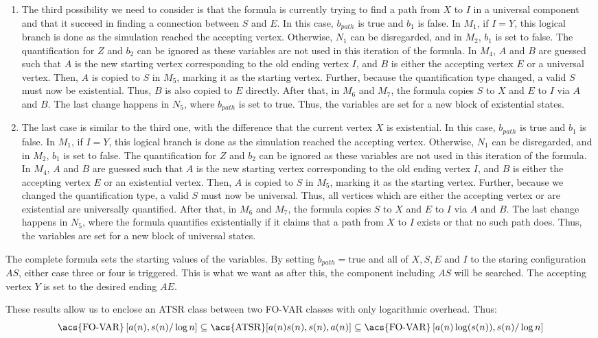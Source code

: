 \begin{enumerate}
    \item The third possibility we need to consider is that the formula is currently trying to find a path from $X$ to $I$ in a universal component and that it succeed in finding a connection between $S$ and $E$.
    In this case, $b_{path}$ is true and $b_1$ is false.
    In $M_1$, if $I = Y$, this logical branch is done as the simulation reached the accepting vertex.
    Otherwise, $N_1$ can be disregarded, and in $M_2$, $b_1$ is set to false.
    The quantification for $Z$ and $b_2$ can be ignored as these variables are not used in this iteration of the formula.
    In $M_4$, $A$ and $B$ are guessed such that $A$ is the new starting vertex corresponding to the old ending vertex $I$, and $B$ is either the accepting vertex $E$ or a universal vertex.
    Then, $A$ is copied to $S$ in $M_5$, marking it as the starting vertex.
    Further, because the quantification type changed, a valid $S$ must now be existential.
    Thus, $B$ is also copied to $E$ directly.
    After that, in $M_6$ and $M_7$, the formula copies $S$ to $X$ and $E$ to $I$ via $A$ and $B$.
    The last change happens in $N_{5}$, where $b_{path}$ is set to true.
    Thus, the variables are set for a new block of existential states.

    \item The last case is similar to the third one, with the difference that the current vertex $X$ is existential.
    In this case, $b_{path}$ is true and $b_1$ is false.
    In $M_1$, if $I = Y$, this logical branch is done as the simulation reached the accepting vertex.
    Otherwise, $N_1$ can be disregarded, and in $M_2$, $b_1$ is set to false.
    The quantification for $Z$ and $b_2$ can be ignored as these variables are not used in this iteration of the formula.
    In $M_4$, $A$ and $B$ are guessed such that $A$ is the new starting vertex corresponding to the old ending vertex $I$, and $B$ is either the accepting vertex $E$ or an existential vertex.
    Then, $A$ is copied to $S$ in $M_5$, marking it as the starting vertex.
    Further, because we changed the quantification type, a valid $S$ must now be universal.
    Thus, all vertices which are either the accepting vertex or are existential are universally quantified.
    After that, in $M_6$ and $M_7$, the formula copies $S$ to $X$ and $E$ to $I$ via $A$ and $B$.
    The last change happens in $N_{5}$, where the formula quantifies existentially if it claims that a path from $X$ to $I$ exists or that no such path does.
    Thus, the variables are set for a new block of  universal states.
\end{enumerate}
The complete formula sets the starting values of the variables.
By setting $b_{path} = \text{true}$ and all of $X, S, E$ and $I$ to the staring configuration $AS$, either case three or four is triggered.
This is what we want as after this, the component including $AS$ will be searched.
The accepting vertex $Y$ is set to the desired ending $AE$.

These results allow us to enclose an \acs{ATSR} class between two \acs{FO-VAR} classes with only logarithmic overhead.
Thus:
\[
    \text{\acs{FO-VAR}}\left[a(n), s(n)/\log n \right] \subseteq \text{\acs{ATSR}}[a(n)s(n), s(n), a(n)] \subseteq \text{\acs{FO-VAR}}\left[a(n)\log(s(n)), s(n)/\log n \right]
\]